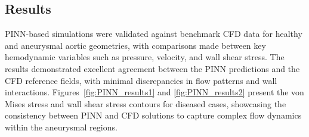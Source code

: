 \documentclass{article}
\begin{document}
\subsection{Results}
\label{sec:PINN_Results}

PINN-based simulations were validated against benchmark CFD data for healthy and aneurysmal aortic geometries, with comparisons made between key hemodynamic variables such as pressure, velocity, and wall shear stress. The results demonstrated excellent agreement between the PINN predictions and the CFD reference fields, with minimal discrepancies in flow patterns and wall interactions. Figures~\ref{fig:PINN_results1} and \ref{fig:PINN_results2} present the von Mises stress and wall shear stress contours for diseased cases, showcasing the consistency between PINN and CFD solutions to capture complex flow dynamics within the aneurysmal regions.
\end{document}
